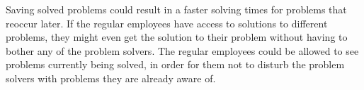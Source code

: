 Saving solved problems could result in a faster solving times for problems that reoccur later.
If the regular employees have access to solutions to different problems, they might even get the solution to their problem without having to bother any of the problem solvers.
The regular employees could be allowed to see problems currently being solved, in order for them not to disturb the problem solvers with problems they are already aware of.








